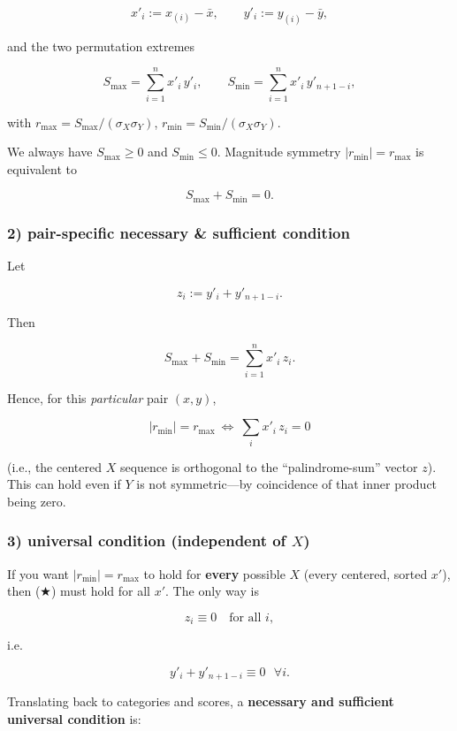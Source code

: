 \documentclass[
  12pt,
]{article}
\theoremstyle{plain}
\theoremstyle{definition}
\theoremstyle{remark}
\begin{document}
\[x'_i:=x_{(i)}-\bar x,\qquad y'_i:=y_{(i)}-\bar y,\]

and the two permutation extremes

\[S_{\max}=\sum_{i=1}^n x'_i\,y'_i,\qquad  
S_{\min}=\sum_{i=1}^n x'_i\,y'_{n+1-i},\]

with \(r_{\max}=S_{\max}/(\sigma_X\sigma_Y)\),
\(r_{\min}=S_{\min}/(\sigma_X\sigma_Y)\).

We always have \(S_{\max}\ge 0\) and \(S_{\min}\le 0\). Magnitude
symmetry \(|r_{\min}|=r_{\max}\) is equivalent to

\[S_{\max}+S_{\min}=0.\]

\subsubsection{\texorpdfstring{2) \textbf{pair-specific necessary \&
sufficient
condition}}{2) pair-specific necessary \& sufficient condition}}\label{pair-specific-necessary-sufficient-condition}

Let

\[z_i := y'_i + y'_{n+1-i}.\]

Then

\[S_{\max}+S_{\min}=\sum_{i=1}^n x'_i\,z_i.\]

Hence, for this \emph{particular} pair \((x,y)\),

\[\boxed{\ |r_{\min}|=r_{\max}\ \Longleftrightarrow\ \sum_i x'_i\,z_i=0\ } \tag{★}\]

(i.e., the centered \(X\) sequence is orthogonal to the
``palindrome-sum'' vector \(z\)).\\
This can hold even if \(Y\) is not symmetric---by coincidence of that
inner product being zero.

\subsubsection{\texorpdfstring{3) \textbf{universal condition
(independent of
\(X\))}}{3) universal condition (independent of X)}}\label{universal-condition-independent-of-x}

If you want \(|r_{\min}|=r_{\max}\) to hold for \textbf{every} possible
\(X\) (every centered, sorted \(x'\)), then (★) must hold for all
\(x'\). The only way is

\[z_i \equiv 0\quad\text{for all }i,\]

i.e.

\[y'_i + y'_{n+1-i}\equiv 0\ \ \ \forall i.\]

Translating back to categories and scores, a \textbf{necessary and
sufficient universal condition} is:
\end{document}

